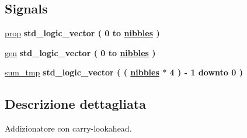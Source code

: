 \subsection*{Signals}
 \begin{DoxyCompactItemize}
\item 
\hyperlink{group___carry_loockahead_ga19afe0b89973d7fc29362431f2e828b7}{prop} {\bfseries \textcolor{vhdlchar}{std\+\_\+logic\+\_\+vector}\textcolor{vhdlchar}{ }\textcolor{vhdlchar}{(}\textcolor{vhdlchar}{ }\textcolor{vhdlchar}{ } \textcolor{vhdldigit}{0} \textcolor{vhdlchar}{ }\textcolor{vhdlchar}{to}\textcolor{vhdlchar}{ }\textcolor{vhdlchar}{ }\textcolor{vhdlchar}{ }\textcolor{vhdlchar}{ }{\bfseries \hyperlink{group___carry_loockahead_ga0b63b586531492d0fa882246cca071c1}{nibbles}} \textcolor{vhdlchar}{ }\textcolor{vhdlchar}{)}\textcolor{vhdlchar}{ }} 
\item 
\hyperlink{group___carry_loockahead_ga7a68948b7b96c7b51036939fad8e71b3}{gen} {\bfseries \textcolor{vhdlchar}{std\+\_\+logic\+\_\+vector}\textcolor{vhdlchar}{ }\textcolor{vhdlchar}{(}\textcolor{vhdlchar}{ }\textcolor{vhdlchar}{ } \textcolor{vhdldigit}{0} \textcolor{vhdlchar}{ }\textcolor{vhdlchar}{to}\textcolor{vhdlchar}{ }\textcolor{vhdlchar}{ }\textcolor{vhdlchar}{ }\textcolor{vhdlchar}{ }{\bfseries \hyperlink{group___carry_loockahead_ga0b63b586531492d0fa882246cca071c1}{nibbles}} \textcolor{vhdlchar}{ }\textcolor{vhdlchar}{)}\textcolor{vhdlchar}{ }} 
\item 
\hyperlink{group___carry_loockahead_ga6cccc2d4712341bbafb7f30f9e9c0f79}{sum\+\_\+tmp} {\bfseries \textcolor{vhdlchar}{std\+\_\+logic\+\_\+vector}\textcolor{vhdlchar}{ }\textcolor{vhdlchar}{(}\textcolor{vhdlchar}{ }\textcolor{vhdlchar}{(}\textcolor{vhdlchar}{ }\textcolor{vhdlchar}{ }\textcolor{vhdlchar}{ }\textcolor{vhdlchar}{ }{\bfseries \hyperlink{group___carry_loockahead_ga0b63b586531492d0fa882246cca071c1}{nibbles}} \textcolor{vhdlchar}{$\ast$}\textcolor{vhdlchar}{ } \textcolor{vhdldigit}{4} \textcolor{vhdlchar}{ }\textcolor{vhdlchar}{)}\textcolor{vhdlchar}{ }\textcolor{vhdlchar}{-\/}\textcolor{vhdlchar}{ } \textcolor{vhdldigit}{1} \textcolor{vhdlchar}{ }\textcolor{vhdlchar}{downto}\textcolor{vhdlchar}{ }\textcolor{vhdlchar}{ } \textcolor{vhdldigit}{0} \textcolor{vhdlchar}{ }\textcolor{vhdlchar}{)}\textcolor{vhdlchar}{ }} 
\end{DoxyCompactItemize}


\subsection{Descrizione dettagliata}
Addizionatore con carry-\/lookahead. 



